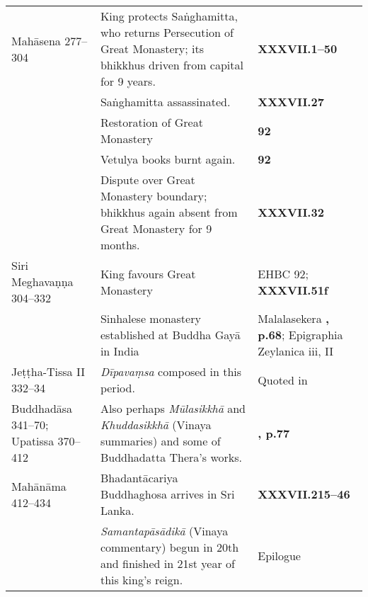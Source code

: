 \begin{tabular}{l|l|l}
    Mahāsena 277–304 & King protects Saṅghamitta, who returns Persecution of Great Monastery; its  bhikkhus driven from capital for 9 years.  & \textbf{\cite{Mhv} XXXVII.1–50}\\
     & Saṅghamitta assassinated. & \textbf{\cite{Mhv} XXXVII.27}\\
     &  Restoration of Great Monastery  & \textbf{\cite{EHBC} 92}\\
     & Vetulya books burnt again.  & \textbf{\cite{EHBC} 92}\\
     & Dispute over Great Monastery boundary; bhikkhus again absent from Great Monastery for 9 months. & \textbf{\cite{Mhv} XXXVII.32}\\
    Siri Meghavaṇṇa 304–332   & King favours Great Monastery & EHBC 92; \textbf{\cite{Mhv} XXXVII.51f}  \\
     & Sinhalese monastery established at Buddha Gayā in India & Malalasekera \textbf{\cite{PLC}, p.68}; Epigraphia Zeylanica iii, II\\
    Jeṭṭha-Tissa II 332–34 & \emph{Dīpavaṃsa} composed in this period. & Quoted in \textbf{\cite{Vin-a}}\\
    Buddhadāsa 341–70; Upatissa  370–412   & Also perhaps \emph{Mūlasikkhā} and \emph{Khuddasikkhā} (Vinaya summaries) and some of Buddhadatta Thera’s works. & \textbf{\cite{PLC}, p.77}\\
    Mahānāma 412–434 & Bhadantācariya Buddhaghosa arrives in Sri Lanka.   & \textbf{\cite{Mhv} XXXVII.215–46} \\
     & \emph{Samantapāsādikā} (Vinaya commentary) begun in 20th and finished in 21st year of this king’s reign. & \textbf{\cite{Vin-a}} Epilogue
\end{tabular}
\else
